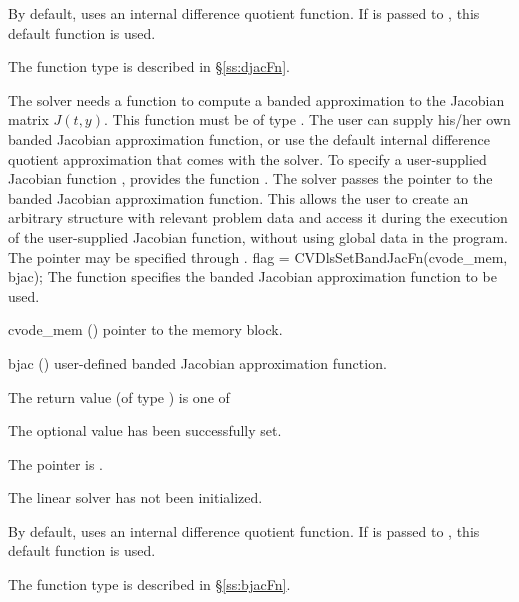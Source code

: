 {
  By default, {\cvdense} uses an internal difference quotient function.
  If  is passed to , this default function is used.

  The function type  is described in \S\ref{ss:djacFn}.
}
The 
{\cvband} solver needs a function to compute a banded approximation to
the Jacobian matrix $J(t,y)$.  This function must be of type . 
The user can supply his/her own banded Jacobian approximation function, 
or use the default internal difference quotient approximation
that comes with the {\cvband} solver.
To specify a user-supplied Jacobian function , 
{\cvband} provides the function .
The {\cvband} solver passes the pointer 
to the banded Jacobian approximation function. This allows the user to
create an arbitrary structure with relevant problem data and access it
during the execution of the user-supplied Jacobian function, without
using global data in the program.  
The pointer  may be specified through .
{
  flag = CVDlsSetBandJacFn(cvode\_mem, bjac);
}
{
  The function  specifies the banded Jacobian
  approximation function to be used.
}
{
  \begin{args}
  \item[cvode\_mem] ()
    pointer to the {\cvodes} memory block.
  \item[bjac] ()
    user-defined banded Jacobian approximation function.
  \end{args}
}
{
  The return value  (of type ) is one of
  \begin{args}
  \item[\Id{CVDLS\_SUCCESS}] 
    The optional value has been successfully set.
  \item[\Id{CVDLS\_MEM\_NULL}]
    The  pointer is .
  \item[\Id{CVDLS\_LMEM\_NULL}]
    The {\cvband} linear solver has not been initialized.
  \end{args}
}
{
  By default, {\cvband} uses an internal difference quotient function.
  If  is passed to , this default function is used.

  The function type  is described in \S\ref{ss:bjacFn}.
}

